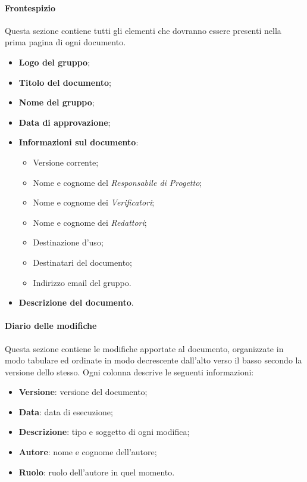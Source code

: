 \paragraph{Frontespizio} \Spazio
Questa sezione contiene tutti gli elementi che dovranno essere presenti nella prima pagina di ogni documento.
\begin{itemize}
	\item \textbf{Logo del gruppo};
	\item \textbf{Titolo del documento};
	\item \textbf{Nome del gruppo};
	\item \textbf{Data di approvazione};
	\item \textbf{Informazioni sul documento}:
	\begin{itemize}
		\item {Versione corrente};
		\item {Nome e cognome del \emph{Responsabile di Progetto}};
		\item {Nome e cognome dei \emph{Verificatori}};
		\item {Nome e cognome dei \emph{Redattori}};
		\item {Destinazione d'uso};
		\item {Destinatari del documento};
		\item {Indirizzo email del gruppo}.
	\end{itemize}
	\item \textbf{Descrizione del documento}.
\end{itemize}



\paragraph{Diario delle modifiche} \Spazio
Questa sezione contiene le modifiche apportate al documento, organizzate in modo tabulare ed ordinate in modo decrescente dall'alto verso il basso secondo la versione dello stesso. Ogni colonna descrive le seguenti informazioni:
\begin{itemize}
	\item \textbf{Versione}: versione del documento;
	\item \textbf{Data}: data di esecuzione;
	\item \textbf{Descrizione}: tipo e soggetto di ogni modifica;
	\item \textbf{Autore}: nome e cognome dell'autore;
	\item \textbf{Ruolo}: ruolo dell'autore in quel momento.	
\end{itemize}

